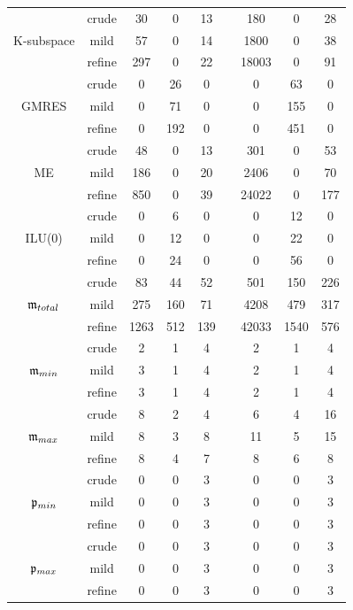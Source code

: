 \begin{table}[h]
\begin{adjustbox}{width=0.8\columnwidth,center}
\begin{tabular}{  ccccccccc }
		\hline
		& crude & 30 & 0 & 13 &  & 180 & 0 & 28 \\
		K-subspace  & mild & 57 & 0 & 14 &  & 1800 & 0 & 38 \\
		& refine & 297 & 0 & 22  & & 18003 & 0 & 91 \\
		\hline
		& crude & 0 & 26 & 0  & & 0 & 63 & 0 \\
		GMRES  & mild & 0 & 71 & 0 & & 0 & 155 & 0 \\
		& refine & 0 & 192 & 0 & & 0 & 451 & 0 \\
		\hline
		& crude & 48 & 0 & 13 & &  301 & 0 & 53 \\
		ME  & mild & 186 & 0 & 20  & & 2406 & 0 & 70 \\
		& refine & 850 & 0 & 39  & & 24022 & 0 & 177 \\
		\hline
		& crude & 0 & 6 & 0 & &  0 & 12 & 0 \\
		ILU(0)  & mild & 0 & 12 & 0  & & 0 & 22 & 0 \\
		& refine & 0 & 24 & 0 &  & 0 & 56 & 0 \\
		\hline
		& crude & 83 & 44 & 52  & & 501 & 150 & 226 \\
		$\mathfrak{m}_{total}$  & mild & 275 & 160 & 71  & & 4208 & 479 & 317 \\
		& refine & 1263 & 512 & 139 &  & 42033 & 1540 & 576 \\
		\hline
		& crude & 2 & 1 & 4  & & 2 & 1 & 4 \\
		$\mathfrak{m}_{min}$  & mild & 3 & 1 & 4  & & 2 & 1 & 4 \\
		& refine & 3 & 1 & 4  & & 2 & 1 & 4 \\
		\hline
		& crude & 8 & 2 & 4  & & 6 & 4 & 16 \\
		$\mathfrak{m}_{max}$  & mild & 8 & 3 & 8  & & 11 & 5 & 15 \\
		& refine & 8 & 4 & 7  & & 8 & 6 & 8 \\
		\hline
		& crude & 0 & 0 & 3  & & 0 & 0 & 3 \\
		$\mathfrak{p}_{min}$  & mild & 0 & 0 & 3 &  & 0 & 0 & 3 \\
		& refine & 0 & 0 & 3  & & 0 & 0 & 3 \\
		\hline
		& crude & 0 & 0 & 3  & & 0 & 0 & 3 \\
		$\mathfrak{p}_{max}$  & mild & 0 & 0 & 3 &  & 0 & 0 & 3  \\
		& refine & 0 & 0 & 3  & & 0 & 0 & 3 \\
		\hline
	\end{tabular}
\end{adjustbox}
\end{table}



